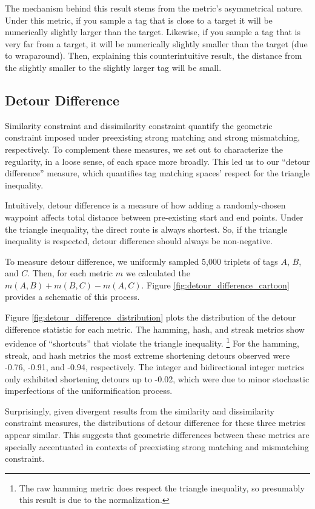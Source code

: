 The mechanism behind this result stems from the metric's asymmetrical nature.
Under this metric, if you sample a tag that is close to a target it will be numerically slightly larger than the target.
Likewise, if you sample a tag that is very far from a target, it will be numerically slightly smaller than the target (due to wraparound).
Then, explaining this counterintuitive result, the distance from the slightly smaller to the slightly larger tag will be small.

\subsection{Detour Difference} \label{sec:detour_difference}



Similarity constraint and dissimilarity constraint quantify the geometric constraint imposed under preexisting strong matching and strong mismatching, respectively.
To complement these measures, we set out to characterize the regularity, in a loose sense, of each space more broadly.
This led us to our ``detour difference'' measure, which quantifies tag matching spaces' respect for the triangle inequality.

Intuitively, detour difference is a measure of how adding a randomly-chosen waypoint affects total distance between pre-existing start and end points.
Under the triangle inequality, the direct route is always shortest.
So, if the triangle inequality is respected, detour difference should always be non-negative.

To measure detour difference, we uniformly sampled 5,000 triplets of tags $A$, $B$, and $C$.
Then, for each metric $m$ we calculated the $m(A, B) + m(B, C) - m(A, C)$.
Figure \ref{fig:detour_difference_cartoon} provides a schematic of this process.

Figure \ref{fig:detour_difference_distribution} plots the distribution of the detour difference statistic for each metric.
The hamming, hash, and streak metrics show evidence of ``shortcuts'' that violate the triangle inequality.%
\footnote{%
The raw hamming metric does respect the triangle inequality, so presumably this result is due to the normalization.
}
For the hamming, streak, and hash metrics the most extreme shortening detours observed were -0.76, -0.91, and -0.94, respectively.
The integer and bidirectional integer metrics only exhibited shortening detours up to -0.02, which were due to minor stochastic imperfections of the uniformification process.

Surprisingly, given divergent results from the similarity and dissimilarity constraint measures, the distributions of detour difference for these three metrics appear similar.
This suggests that geometric differences between these metrics are specially accentuated in contexts of preexisting strong matching and mismatching constraint.
